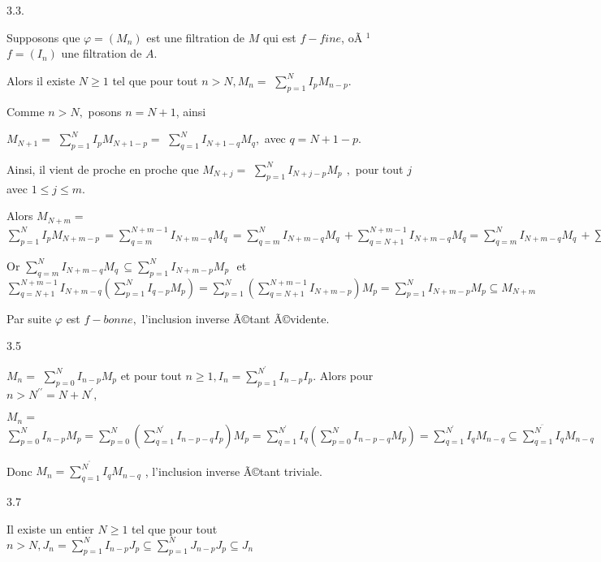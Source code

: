 \documentclass[11pt, twoside]{article}
\begin{document}
3.3.

Supposons que $\varphi =(M_{n})$ est une filtration de $M$ qui est $f-fine$,
o\~{A}%
${{}^1}$
$f=(I_{n})$ une filtration de $A.$

Alors il existe $N\geq 1$ tel que pour tout $n>N,M_{n}=$ $%
\sum\limits_{p=1}^{N}I_{p}M_{n-p}.$

Comme $n>N,$ posons $n=N+1$, ainsi

$M_{N+1}=$ $\sum\limits_{p=1}^{N}I_{p}M_{N+1-p}=$ $\sum%
\limits_{q=1}^{N}I_{N+1-q}M_{q},$ avec $q=N+1-p.$

Ainsi, il vient de proche en proche que $M_{N+j}=$ $\sum%
\limits_{p=1}^{N}I_{N+j-p}M_{p}\,\ ,$ pour tout $j$ avec $1\leq j\leq m.$

Alors $M_{N+m}=$ $\sum\limits_{p=1}^{N}I_{p}M_{N+m-p}\,=\sum%
\limits_{q=m}^{N+m-1}I_{N+m-q}M_{q}\,=\sum\limits_{q=m}^{N}I_{N+m-q}M_{q}\,+%
\sum\limits_{q=N+1}^{N+m-1}I_{N+m-q}M_{q}=\sum%
\limits_{q=m}^{N}I_{N+m-q}M_{q}\,+\sum\limits_{q=N+1}^{N+m-1}I_{N+m-q}(\sum%
\limits_{p=1}^{N}I_{q-p}M_{p}).$

Or $\sum\limits_{q=m}^{N}I_{N+m-q}M_{q}\,\subseteq
\sum\limits_{p=1}^{N}I_{N+m-p}M_{p}\,$\ et $\sum%
\limits_{q=N+1}^{N+m-1}I_{N+m-q}(\sum\limits_{p=1}^{N}I_{q-p}M_{p})=\sum%
\limits_{p=1}^{N}(\sum\limits_{q=N+1}^{N+m-1}I_{N+m-p})M_{p}=\sum%
\limits_{p=1}^{N}I_{N+m-p}M_{p}\subseteq M_{N+m}$

Par suite $\varphi $ est $f-bonne,$ l'inclusion inverse \~{A}\copyright tant 
\~{A}\copyright vidente.

\bigskip

3.5

$M_{n}=$ $\sum\limits_{p=0}^{N}I_{n-p}M_{p}$ et pour tout $n\geq
1,I_{n}=\sum\limits_{p=1}^{N^{\prime }}I_{n-p}I_{p}.$ Alors pour $%
n>N^{\prime \prime }=N+N^{\prime},$

$M_{n}=$ $\sum\limits_{p=0}^{N}I_{n-p}M_{p}=\sum\limits_{p=0}^{N}(\sum%
\limits_{q=1}^{N^{\prime }}I_{n-p-q}I_{p})M_{p}=\sum\limits_{q=1}^{N^{\prime
}}I_{q}(\sum\limits_{p=0}^{N}I_{n-p-q}M_{p})=\sum\limits_{q=1}^{N^{\prime
}}I_{q}M_{n-q}\subseteq \sum\limits_{q=1}^{N^{^{\prime \prime
}}}I_{q}M_{n-q} $

Donc $M_{n}=\sum\limits_{q=1}^{N^{^{\prime \prime }}}I_{q}M_{n-q}$ ,
l'inclusion inverse \~{A}\copyright tant triviale.

\bigskip

3.7

Il existe un entier $N\geq 1$ tel que pour tout $n>N,J_{n}=\sum%
\limits_{p=1}^{N}I_{n-p}J_{p}\subseteq
\sum\limits_{p=1}^{N}J_{n-p}J_{p}\subseteq J_{n}$
\end{document}
